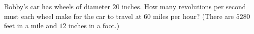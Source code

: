 Bobby's car has wheels of diameter $20$ inches. How many revolutions per second must each wheel make for the car to travel at $60$ miles per hour? (There are $5280$ feet in a mile and $12$ inches in a foot.)
